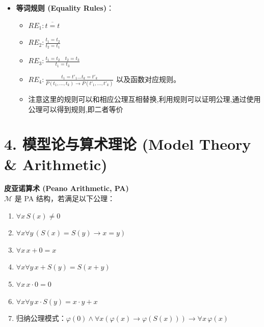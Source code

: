 \documentclass[12pt, a4paper]{article}
\begin{document}
\begin{itemize}
\begin{prooftree}
        \end{prooftree}
    \item \textbf{等词规则 (Equality Rules)}：
    \begin{itemize}
        \item \(RE_1: \overline{t=t}\)
        \item \(RE_2: \frac{t_1=t_2}{t_2=t_1}\)
        \item \(RE_3: \frac{t_1=t_2 \quad t_2=t_3}{t_1=t_3}\)
        \item \(RE_4: \frac{t_1=t'_1 \dots t_k=t'_k}{P(t_1,\dots,t_k) \to P(t'_1,\dots,t'_k)}\) 以及函数对应规则。
        \item 注意这里的规则可以和相应公理互相替换,利用规则可以证明公理,通过使用公理可以得到规则,即二者等价
    \end{itemize}
\end{itemize}


\section*{4. 模型论与算术理论 (Model Theory \& Arithmetic)}

\begin{mdframed}
    \textbf{皮亚诺算术 (Peano Arithmetic, PA)} \\
    \(\mathcal{M}\) 是 PA 结构，若满足以下公理：
    \begin{enumerate}
        \item \(\forall x \, S(x) \neq 0\)
        \item \(\forall x \forall y \, (S(x) = S(y) \to x=y)\)
        \item \(\forall x \, x + 0 = x\)
        \item \(\forall x \forall y \, x + S(y) = S(x+y)\)
        \item \(\forall x \, x \cdot 0 = 0\)
        \item \(\forall x \forall y \, x \cdot S(y) = x \cdot y + x\)
        \item 归纳公理模式：\(\varphi(0) \wedge \forall x(\varphi(x) \to \varphi(S(x))) \to \forall x \, \varphi(x)\)
    \end{enumerate}
\end{mdframed}
\end{document}
